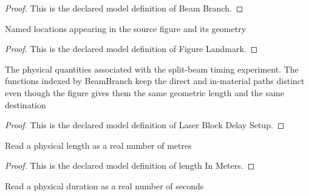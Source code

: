 \begin{proof}
  This is the declared model definition of Beam Branch.
\end{proof}
\begin{definition}
  \label{def:physics:phyx-mini-0092:phyxminiproblems-problemphyxmini0092-figurelandmark}
  Named locations appearing in the source figure and its geometry
\end{definition}
\begin{proof}
  This is the declared model definition of Figure Landmark.
\end{proof}
\begin{definition}
  \label{def:physics:phyx-mini-0092:phyxminiproblems-problemphyxmini0092-laserblockdelaysetup}
  The physical quantities associated with the split-beam timing experiment. The functions indexed by BeamBranch keep the direct and in-material paths distinct even though the figure gives them the same geometric length and the same destination
\end{definition}
\begin{proof}
  This is the declared model definition of Laser Block Delay Setup.
\end{proof}
\begin{definition}
  \label{def:physics:phyx-mini-0092:phyxminiproblems-problemphyxmini0092-lengthinmeters}
  Read a physical length as a real number of metres
\end{definition}
\begin{proof}
  This is the declared model definition of length In Meters.
\end{proof}
\begin{definition}
  \label{def:physics:phyx-mini-0092:phyxminiproblems-problemphyxmini0092-durationinseconds}
  Read a physical duration as a real number of seconds
\end{definition}
